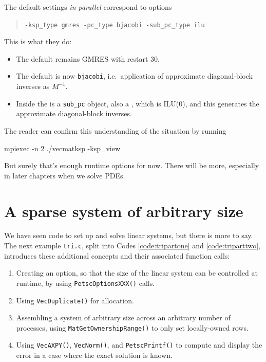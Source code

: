 The default \PETSc \pKSP settings \emph{in parallel} correspond to options
\begin{quote}
\texttt{-ksp\_type gmres -pc\_type bjacobi -sub\_pc\_type ilu}
\end{quote}
This is what they do:
\begin{itemize}
\item The default \pKSP remains GMRES with restart 30.
\item The default \pPC is now \texttt{bjacobi}, i.e.~application of approximate diagonal-block inverses as $M^{-1}$.
\item Inside the \pPC is a \texttt{sub\_pc} object, also a \pPC, which is ILU($0$), and this generates the approximate diagonal-block inverses.
\end{itemize}
The reader can confirm this understanding of the situation by running
\begin{cline}
mpiexec -n 2 ./vecmatksp -ksp_view
\end{cline}

But surely that's enough runtime options for now.  There will be more, especially in later chapters when we solve PDEs.


\section{A sparse system of arbitrary size}

We have seen \PETSc code to set up and solve linear systems, but there is more to say.  The next example \texttt{tri.c}, split into Codes \ref{code:tripartone} and \ref{code:triparttwo}, introduces these additional concepts and their associated function calls:
\begin{enumerate}
\item Creating an option, so that the size of the linear system can be controlled at runtime, by using \texttt{PetscOptionsXXX()} calls.
\item Using \texttt{VecDuplicate()} for allocation.
\item Assembling a system of arbitrary size across an arbitrary number of processes, using \texttt{MatGetOwnershipRange()} to only set locally-owned rows.
\item Using \texttt{VecAXPY()}, \texttt{VecNorm()}, and \texttt{PetscPrintf()} to compute and display the error in a case where the exact solution is known.
\end{enumerate}

